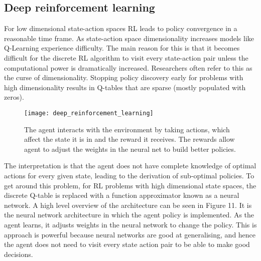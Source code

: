 \subsection{Deep reinforcement learning}
For low dimensional state-action spaces RL leads to policy convergence in a reasonable time frame. As state-action space dimensionality increases models like Q-Learning experience difficulty. The main reason for this is that it becomes difficult for the discrete RL algorithm to visit every state-action pair unless the computational power is dramatically increased. Researchers often refer to this as the curse of dimensionality. Stopping policy discovery early for problems with high dimensionality results in Q-tables that are sparse (mostly populated with zeros).
\begin{figure}[ht]
\centering
\texttt{[image: deep\_reinforcement\_learning]}
\caption{The agent interacts with the environment by taking actions, which affect the state it is in and the reward it receives. The rewards allow agent to adjust the weights in the neural net to build better policies.}
\end{figure}

The interpretation is that the agent does not have complete knowledge of optimal actions for every given state, leading to the derivation of sub-optimal policies. To get around this problem, for RL problems with high dimensional state spaces, the discrete Q-table is replaced with a function approximator known as a neural network. A high level overview of the architecture can be seen in Figure 11. It is the neural network architecture in which the agent policy is implemented. As the agent learns, it adjusts weights in the neural network to change the policy. This is approach is powerful because neural networks are good at generalising, and hence the agent does not need to visit every state action pair to be able to make good decisions.